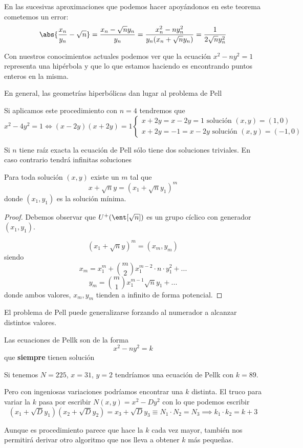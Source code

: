 \documentclass{apuntes}
\begin{document}
\obs En las sucesivas aproximaciones que podemos hacer apoyándonos en este teorema cometemos un error:
\[\abs{\frac{x_n}{y_n} - \sqrt{n}} = \frac{x_n-\sqrt{n}y_n}{y_n} = \frac{x_n^2-ny_n^2}{y_n(x_n + \sqrt{n}y_n)}=\frac{1}{2\sqrt{n}y_n^2}\]

Con nuestros conocimientos actuales podemos ver que la ecuación $x^2-ny^2 =1$ representa una hipérbola y que lo que estamos haciendo es encontrando puntos enteros en la misma.

En general, las geometrías hiperbólicas dan lugar al problema de Pell

\obs Si aplicamos este procedimiento con $n=4$ tendremos que 
\[x^2-4y^2 = 1 \iff (x-2y)(x+2y) = 1 \left\{ \begin{array}{l} x+2y=x-2y = 1 \text{ solución } (x,y)=(1,0) \\ x+2y=-1=x-2y \text{ solución } (x,y)=(-1,0)\end{array}\right.\]

\begin{theorem}
Si $n$ tiene raíz exacta la ecuación de Pell sólo tiene dos soluciones triviales. En caso contrario tendrá infinitas soluciones
\end{theorem}

\begin{theorem}
Para toda solución $(x,y)$ existe un $m$ tal que
\[x+\sqrt{n}y = \left( x_1+\sqrt{n}y_1\right)^m\]
donde $(x_1,y_1)$ es la solución mínima.
\end{theorem}
\begin{proof}
Debemos observar que $U^+(\ent[\sqrt{n}])$ es un grupo cíclico con generador $(x_1,y_1)$.

\[(x_1+\sqrt{n}y)^m = (x_m,y_m)\]
siendo
\[x_m = x_1^m+ {m \choose 2 } x_1^{m-2}\cdot n \cdot y_1^2 + ...\]
\[y_m = {m \choose 1}x_1^{m-1}\sqrt{n}y_1 + ...\]
donde ambos valores, $x_m,y_m$ tienden a infinito de forma potencial.
\end{proof}

El problema de Pell puede generalizarse forzando al numerador a alcanzar distintos valores. 

\begin{defn}
Las ecuaciones de Pellk son de la forma
\[x^2-ny^2 = k\]
que \textbf{siempre} tienen solución
\end{defn}

\begin{example}
Si tenemos $N=225$, $x=31$, $y=2$ tendríamos una ecuación de Pellk con $k=89$.

Pero con ingeniosas variaciones podríamos encontrar una $k$ distinta. El truco para variar la $k$ pasa por escribir $N(x,y)=x^2-Dy^2$ con lo que podemos escribir
\[(x_1+\sqrt{D}y_1)(x_2+\sqrt{D}y_2) = x_3 + \sqrt{D}y_3 \equiv N_1\cdot N_2 = N_3 \implies k_1\cdot k_2=k+3\]

Aunque es procedimiento parece que hace la $k$ cada vez mayor, también nos permitirá derivar otro algoritmo que nos lleva a obtener $k$ más pequeñas.
\end{example}
\end{document}
